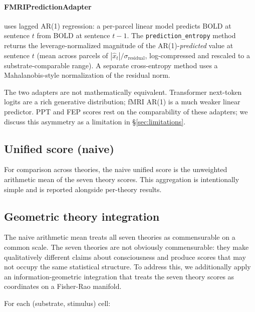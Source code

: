 \documentclass[11pt,a4paper]{article}
\begin{document}
\paragraph{FMRIPredictionAdapter} uses lagged AR(1) regression: a per-parcel linear model predicts BOLD at sentence $t$ from BOLD at sentence $t-1$. The \texttt{prediction\_entropy} method returns the leverage-normalized magnitude of the AR(1)-\emph{predicted} value at sentence $t$ (mean across parcels of $|\hat{x}_t| / \sigma_{\text{residual}}$, log-compressed and rescaled to a substrate-comparable range). A separate cross-entropy method uses a Mahalanobis-style normalization of the residual norm.

The two adapters are not mathematically equivalent. Transformer next-token logits are a rich generative distribution; fMRI AR(1) is a much weaker linear predictor. PPT and FEP scores rest on the comparability of these adapters; we discuss this asymmetry as a limitation in \S\ref{sec:limitations}.

\subsection{Unified score (naive)}

For comparison across theories, the naive unified score is the unweighted arithmetic mean of the seven theory scores. This aggregation is intentionally simple and is reported alongside per-theory results.

\subsection{Geometric theory integration}

The naive arithmetic mean treats all seven theories as commensurable on a common scale. The seven theories are not obviously commensurable: they make qualitatively different claims about consciousness and produce scores that may not occupy the same statistical structure. To address this, we additionally apply an information-geometric integration \citep{amari2000methods} that treats the seven theory scores as coordinates on a Fisher-Rao manifold.

For each (substrate, stimulus) cell:
\end{document}
